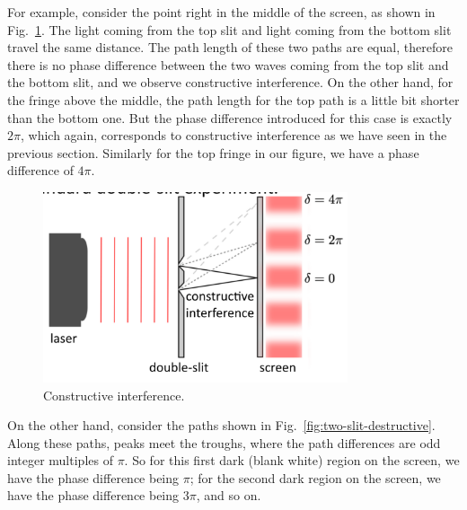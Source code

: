 
For example, consider the point right in the middle of the screen, as shown in Fig.~\ref{fig:two-slit-constructive}. The light coming from the top slit and light coming from the bottom slit travel the same distance. The path length of these two paths are equal, therefore there is no phase difference between the two waves coming from the top slit and the bottom slit, and we observe constructive interference. On the other hand, for the fringe above the middle, the path length for the top path is a little bit shorter than the bottom one. But the phase difference introduced for this case is exactly $2\pi$, which again, corresponds to constructive interference as we have seen in the previous section. Similarly for the top fringe in our figure, we have a phase difference of $4\pi$.
\begin{figure}[H]
   \centering
    \includegraphics[width=0.8\textwidth]{lesson6/double_slit_constructive.pdf}    
        \caption{Constructive interference.}
    \label{fig:two-slit-constructive}    
\end{figure}

On the other hand, consider the paths shown in Fig.~\ref{fig:two-slit-destructive}. Along these paths, peaks meet the troughs, where the path differences are odd integer multiples of $\pi$. So for this first dark (blank white) region on the screen, we have the phase difference being $\pi$; for the second dark region on the screen, we have the phase difference being $3\pi$, and so on.

